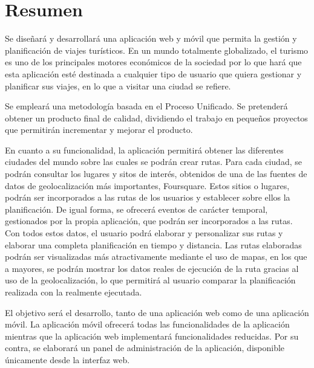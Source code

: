 \newpage
\chapter*{Resumen}
Se diseñará y desarrollará una aplicación web y móvil que permita la gestión y planificación de viajes turísticos. En un mundo totalmente globalizado, el turismo es uno de los principales motores económicos de la sociedad por lo que hará que esta aplicación esté destinada a cualquier tipo de usuario que quiera gestionar y planificar sus viajes, en lo que a visitar una ciudad se refiere.

Se empleará una metodología basada en el Proceso Unificado. Se pretenderá obtener un producto final de calidad, dividiendo el trabajo en pequeños proyectos que permitirán incrementar y mejorar el producto.

En cuanto a su funcionalidad, la aplicación permitirá obtener las diferentes ciudades del mundo sobre las cuales se podrán crear rutas. Para cada ciudad, se podrán consultar los lugares y sitos de interés, obtenidos de una de las fuentes de datos de geolocalización más importantes, Foursquare. Estos sitios o lugares, podrán ser incorporados a las rutas de los usuarios y establecer sobre ellos la planificación. De igual forma, se ofrecerá eventos de carácter temporal, gestionados por la propia aplicación, que podrán ser incorporados a las rutas. Con todos estos datos, el usuario podrá elaborar y personalizar sus rutas y elaborar una completa planificación en tiempo y distancia. Las rutas elaboradas podrán ser visualizadas más atractivamente mediante el uso de mapas, en los que a mayores, se podrán mostrar los datos reales de ejecución de la ruta gracias al uso de la geolocalización, lo que permitirá al usuario comparar la planificación realizada con la realmente ejecutada.

El objetivo será el desarrollo, tanto de una aplicación web como de una aplicación móvil. La aplicación móvil ofrecerá todas las funcionalidades de la aplicación mientras que la aplicación web implementará funcionalidades reducidas. Por su contra, se elaborará un panel de administración de la aplicación, disponible únicamente desde la interfaz web.